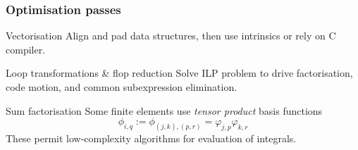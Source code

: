 \documentclass[presentation]{beamer}
\begin{document}
\begin{frame}
  \frametitle{Optimisation passes}
  \begin{block}{Vectorisation}
    Align and pad data structures, then use intrinsics or rely on C
    compiler.
  \end{block}

  \begin{block}{Loop transformations \& flop reduction}
    Solve ILP problem to drive factorisation, code motion, and common
    subexpression elimination.
  \end{block}

  \begin{block}{Sum factorisation}
    Some finite elements use \emph{tensor product} basis functions
    \begin{equation*}
      \phi_{i,q} := \phi_{(j,k),(p,r)} = \varphi_{j,p}\varphi_{k,r}
    \end{equation*}
    These permit low-complexity algorithms for evaluation of integrals.
  \end{block}
\end{frame}
\end{document}
